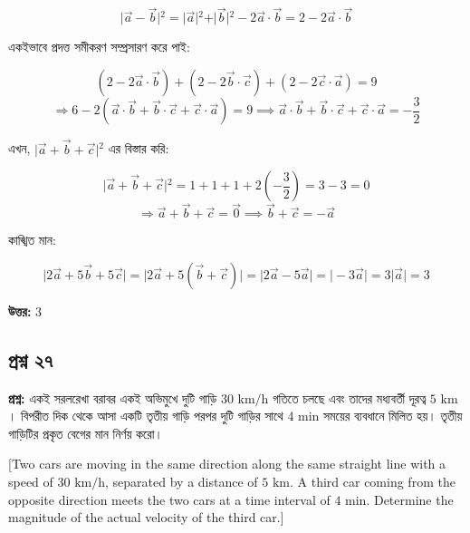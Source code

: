 \documentclass{article}
\begin{document}
$$\vert{}\vec{a} - \vec{b}\vert{}^2 = \vert{}\vec{a}\vert{}^2 + \vert{}\vec{b}\vert{}^2 - 2\vec{a} \cdot \vec{b} = 2 - 2\vec{a} \cdot \vec{b}$$

একইভাবে প্রদত্ত সমীকরণ সম্প্রসারণ করে পাই:

$$(2 - 2\vec{a} \cdot \vec{b}) + (2 - 2\vec{b} \cdot \vec{c}) + (2 - 2\vec{c} \cdot \vec{a}) = 9$$
$$\Rightarrow 6 - 2(\vec{a} \cdot \vec{b} + \vec{b} \cdot \vec{c} + \vec{c} \cdot \vec{a}) = 9 \implies \vec{a} \cdot \vec{b} + \vec{b} \cdot \vec{c} + \vec{c} \cdot \vec{a} = -\frac{3}{2}$$

এখন, $\vert{}\vec{a} + \vec{b} + \vec{c}\vert{}^2$ এর বিস্তার করি:

$$\vert{}\vec{a} + \vec{b} + \vec{c}\vert{}^2 = 1 + 1 + 1 + 2\left(-\frac{3}{2}\right) = 3 - 3 = 0$$
$$\Rightarrow \vec{a} + \vec{b} + \vec{c} = \vec{0} \implies \vec{b} + \vec{c} = -\vec{a}$$

কাঙ্খিত মান:

$$\vert{}2\vec{a} + 5\vec{b} + 5\vec{c}\vert{} = \vert{}2\vec{a} + 5(\vec{b} + \vec{c})\vert{} = \vert{}2\vec{a} - 5\vec{a}\vert{} = \vert{}-3\vec{a}\vert{} = 3\vert{}\vec{a}\vert{} = 3$$

\textbf{উত্তর:} $3$

\hrulefill

\subsection*{প্রশ্ন ২৭}
\textbf{প্রশ্ন:} একই সরলরেখা বরাবর একই অভিমুখে দুটি গাড়ি $30\text{ km/h}$ গতিতে চলছে এবং তাদের মধ্যবর্তী দূরত্ব $5\text{ km}$। বিপরীত দিক থেকে আসা একটি তৃতীয় গাড়ি পরপর দুটি গাড়ির সাথে $4\text{ min}$ সময়ের ব্যবধানে মিলিত হয়। তৃতীয় গাড়িটির প্রকৃত বেগের মান নির্ণয় করো।

[Two cars are moving in the same direction along the same straight line with a speed of $30\text{ km/h}$, separated by a distance of $5\text{ km}$. A third car coming from the opposite direction meets the two cars at a time interval of $4\text{ min}$. Determine the magnitude of the actual velocity of the third car.]
\end{document}
